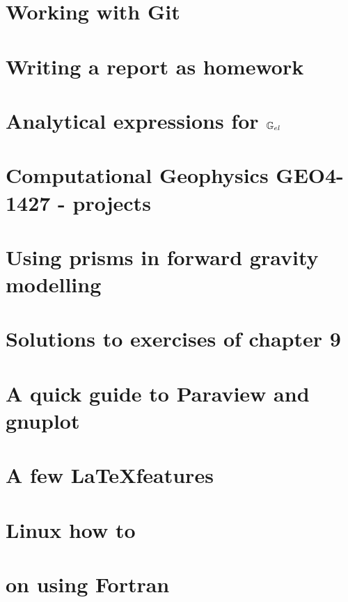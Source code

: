 \documentclass[a4paper,12pt]{report}
\begin{document}
\chapter{Working with Git}  %
\chapter{Writing a report as homework \label{app:grading}}  %
\chapter{Analytical expressions for ${\mathbb{G}}_{el}$} \label{app:Gel}  %
\chapter{Computational Geophysics GEO4-1427 - projects}  %
\chapter{Using prisms in forward gravity modelling \label{app:prisms}}  %
\chapter{Solutions to exercises of chapter 9 \label{app:gravsols}}  %
\chapter{A quick guide to Paraview and gnuplot}   %
\chapter{A few \LaTeX features}  %
\chapter{Linux how to}  %
\chapter{on using Fortran}  %
\end{document}
